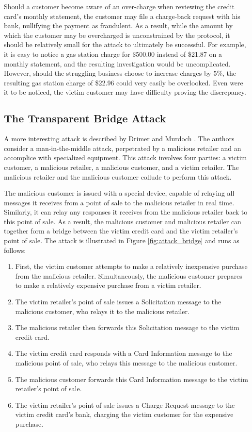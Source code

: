 Should a customer become aware of an over-charge when reviewing the credit card's monthly statement, the customer may file a charge-back request with his bank, nullifying the payment as fraudulent.
As a result, while the amount by which the customer may be overcharged is unconstrained by the protocol, it should be relatively small for the attack to ultimately be successful.
For example, it is easy to notice a gas station charge for \$500.00 instead of \$21.87 on a monthly statement, and the resulting investigation would be uncomplicated.
However, should the struggling business choose to increase charges by 5\%, the resulting gas station charge of \$22.96 could very easily be overlooked.
Even were it to be noticed, the victim customer may have difficulty proving the discrepancy.


\subsection{The Transparent Bridge Attack}
\label{sec:transparent-bridge}
A more interesting attack is described by Drimer and Murdoch \cite{Drimer:2007:KYE:1362903.1362910}.
The authors consider a man-in-the-middle attack, perpetrated by a malicious retailer and an accomplice with specialized equipment.
This attack involves four parties: a victim customer, a malicious retailer, a malicious customer, and a victim retailer.
The malicious retailer and the malicious customer collude to perform this attack.

The malicious customer is issued with a special device, capable of relaying all messages it receives from a point of sale to the malicious retailer in real time.
Similarly, it can relay any responses it receives from the malicious retailer back to this point of sale.
As a result, the malicious customer and malicious retailer can together form a bridge between the victim credit card and the victim retailer's point of sale.
The attack is illustrated in Figure \ref{fig:attack_bridge} and runs as follows:

\begin{enumerate}
\item First, the victim customer attempts to make a relatively inexpensive purchase from the malicious retailer.
Simultaneously, the malicious customer prepares to make a relatively expensive purchase from a victim retailer.
\item The victim retailer's point of sale issues a Solicitation message to the malicious customer, who relays it to the malicious retailer.
\item The malicious retailer then forwards this Solicitation message to the victim credit card.
\item The victim credit card responds with a Card Information message to the malicious point of sale, who relays this message to the malicious customer.
\item The malicious customer forwards this Card Information message to the victim retailer's point of sale.
\item The victim retailer's point of sale issues a Charge Request message to the victim credit card's bank, charging the victim customer for the expensive purchase.
\end{enumerate}

